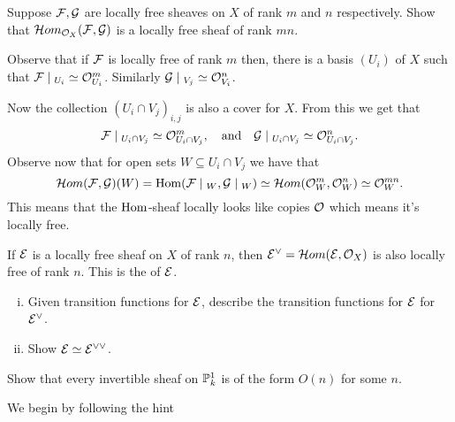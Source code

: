 \documentclass[12pt]{memoir}
\begin{document}
\begin{Ej}[14.2.B Vakil]
    Suppose $\mathcal{F},\mathcal{G}$ are locally free sheaves on $X$ of rank $m$ and $n$ respectively. Show that $\mathcal{H} om_{\mathcal{O}_X}(\mathcal{F},\mathcal{G})$ is a locally free sheaf of rank $mn$.
\end{Ej}

\begin{ptcbr}
Observe that if $\mathcal{F}$ is locally free of rank $m$ then, there is a basis $(U_i)$ of $X$ such that $\cF\mid_{U_i}\isom \cO_{U_i}^m$. Similarly $\cG\mid_{V_j}\isom \cO_{V_i}^n$.\par 
Now the collection $(U_i\cap V_j)_{i,j}$ is also a cover for $X$. From this we get that 
$$\cF\mid_{U_i\cap V_j}\isom \cO_{U_i\cap V_j}^m,\word{and}\cG\mid_{U_i\cap V_j}\isom \cO_{U_i\cap V_j}^n.$$
Observe now that for open sets $W\subseteq U_i\cap V_j$ we have that 
$$\cH om(\cF,\cG)(W)=\Hom(\cF\mid_W,\cG\mid_W)\isom\cH om(\cO_W^m,\cO_W^n)\isom\cO^{mn}_W.$$
This means that the $\operatorname{Hom}$-sheaf locally looks like copies $\mathcal{O}$ which means it's locally free. 
\end{ptcbr}

\begin{Ej}[14.2.C Vakil]
If $\mathcal{E}$ is a locally free sheaf on $X$ of rank $n$, then $\mathcal{E}^\lor=\mathcal{H} om(\mathcal{E},\mathcal{O}_X)$ is also locally free of rank $n$. This is the  of $\mathcal{E}$. 
\begin{enumerate}[i)]
    \itemsep=-0.4em
    \item Given transition functions for $\mathcal{E}$, describe the transition functions for $\mathcal{E}$ for $\mathcal{E}^\lor$. 
    \item Show $\mathcal{E}\simeq\mathcal{E}^{\lor\lor}$. 
\end{enumerate}
\end{Ej}

\begin{ptcbr}
    
\end{ptcbr}

\begin{Ej}
    Show that every invertible sheaf on $\mathbb{P}^1_k$ is of the form $O(n)$ for some $n$. 
\end{Ej}

\begin{ptcbr}
    We begin by following the hint 
\end{ptcbr}
\end{document}
